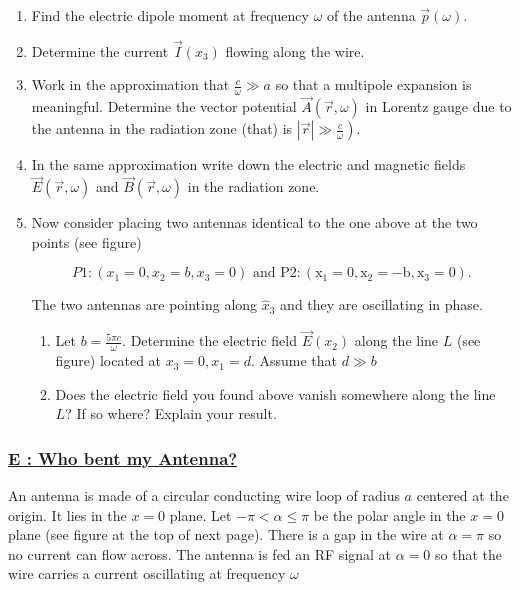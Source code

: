 \begin{enumerate}
	\item  Find the electric dipole moment at frequency $\omega$ of the antenna $\vec{p}(\omega)$.
	\item Determine the current $\vec{I}\left(x_{3}\right)$ flowing along the wire.
	\item Work in the approximation that $\frac{c}{\omega} \gg a$ so that a multipole expansion is meaningful. Determine the vector potential $\vec{A}(\vec{r}, \omega)$ in Lorentz gauge due to the antenna in the radiation zone (that) is $\left.|\vec{r}| \gg \frac{c}{\omega}\right)$.
	\item In the same approximation write down the electric and magnetic fields $\vec{E}(\vec{r}, \omega)$ and $\vec{B}(\vec{r}, \omega)$ in the radiation zone.
	\item Now consider placing two antennas identical to the one above at the two points (see figure)
	
	\begin{equation}
		P 1:\left(x_{1}=0, x_{2}=b, x_{3}=0\right) \text { and } \mathrm{P} 2:\left(\mathrm{x}_{1}=0, \mathrm{x}_{2}=-\mathrm{b}, \mathrm{x}_{3}=0\right).
	\end{equation}

	The two antennas are pointing along $\hat{x}_{3}$ and they are oscillating in phase.

	\begin{enumerate}
		\item Let $b=\frac{5 \pi c}{\omega} .$ Determine the electric field $\vec{E}\left(x_{2}\right)$ along the line $L$ (see figure) located at $x_{3}=0, x_{1}=d .$ Assume that $d \gg b$
		\item Does the electric field you found above vanish somewhere along the line $L ?$ If so where?
		Explain your result.
	\end{enumerate}
\end{enumerate}
	
	
\subsubsection{\hyperref[E : Who bent my Antenna?]{E : Who bent my Antenna?}}
	
An antenna is made of a circular conducting wire loop of radius $a$ centered at the origin. It lies in the $x=0$ plane. Let $-\pi<\alpha \leq \pi$ be the polar angle in the $x=0$ plane (see figure at the top of next page). There is a gap in the wire at $\alpha=\pi$ so no current can flow across. The antenna is fed an RF signal at $\alpha=0$ so that the wire carries a current oscillating at frequency $\omega$


